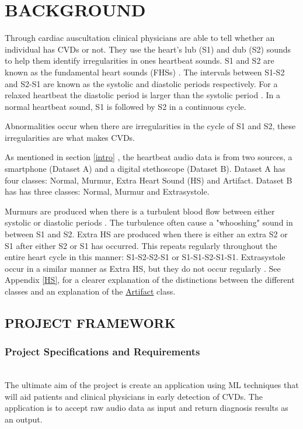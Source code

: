 \documentclass[10pt,twocolumn]{witseiepaper}
\begin{document}

\section{BACKGROUND}
\label{back}
Through cardiac auscultation clinical physicians are able to tell whether an individual has CVDs or not. They use the heart's lub (S1) and dub (S2) sounds to help them identify irregularities in ones heartbeat sounds. S1 and S2 are known as the fundamental heart sounds (FHSs) \cite{54}. The intervals between S1-S2 and S2-S1 are known as the systolic and diastolic periods respectively. For a relaxed heartbeat the diastolic period is larger than the systolic period \cite{orient2010sapira}. In a normal heartbeat sound, S1 is followed by S2 in a continuous cycle.

Abnormalities occur when there are irregularities in the cycle of S1 and S2, these irregularities are what makes CVDs. 

As mentioned in section \ref{intro} , the heartbeat audio data is from two sources, a smartphone (Dataset A) and a digital stethoscope (Dataset B). Dataset A has four classes: Normal, Murmur, Extra Heart Sound (HS) and Artifact. Dataset B has has three classes: Normal, Murmur and Extrasystole. 

Murmurs are produced when there is a turbulent blood flow between either systolic or diastolic periods \cite{35}. The turbulence often cause a "whooshing" sound in between S1 and S2. Extra HS are produced when there is either an extra S2 or S1 after either S2 or S1 has occurred. This repeats regularly throughout the entire heart cycle in this manner: S1-S2-S2-S1 or S1-S1-S2-S1-S1. Extrasystole occur in a similar manner as Extra HS, but they do not occur regularly \cite{bentley}. See Appendix \ref{HS}, for a clearer explanation of the distinctions between the different classes and an explanation of the \hyperref[sec:arti]{Artifact} class.

\subsection{PROJECT FRAMEWORK}
\subsubsection{Project Specifications and Requirements}
\label{sec:req}
\textcolor{white}{Ke a leboga Ntate}\\
The ultimate aim of the project is create an application using ML techniques that will aid patients and clinical physicians in early detection of CVDs. The application is to accept raw audio data as input and return diagnosis results as an output.
\end{document}
